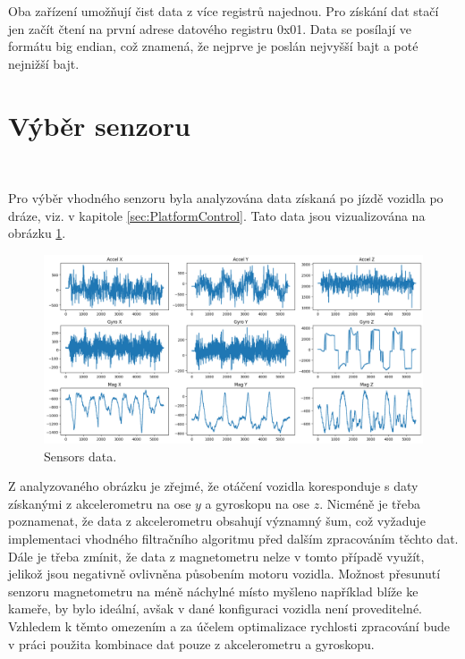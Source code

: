 Oba zařízení umožňují čist data z více registrů najednou. Pro získání dat stačí jen
začít čtení na první adrese datového registru 0x01. Data se posílají ve formátu big endian, což znamená, že nejprve je poslán nejvyšší bajt a poté nejnižší bajt.

\section{Výběr senzoru}\

Pro výběr vhodného senzoru byla analyzována data získaná po jízdě vozidla po dráze, viz. v kapitole \ref{sec:PlatformControl}. Tato data jsou vizualizována na obrázku \ref{fig:Sensors}.
\begin{figure}[!h]
    \centering
    \includegraphics[width = 0.5\linewidth]{Figures/Sensors.png}
    \caption{Sensors data.}
    \label{fig:Sensors}
\end{figure}

Z analyzovaného obrázku je zřejmé, že otáčení vozidla koresponduje s daty získanými z akcelerometru na 
ose $y$ a gyroskopu na ose $z$. Nicméně je třeba poznamenat, že data z akcelerometru obsahují významný 
šum, což vyžaduje implementaci vhodného filtračního algoritmu před dalším zpracováním těchto dat. Dále 
je třeba zmínit, že data z magnetometru nelze v tomto případě využít, jelikož jsou negativně ovlivněna 
působením motoru vozidla. Možnost přesunutí senzoru magnetometru na méně náchylné místo myšleno například 
blíže ke kameře, by bylo ideální, avšak v dané konfiguraci vozidla není proveditelné. Vzhledem k 
těmto omezením a za účelem optimalizace rychlosti zpracování bude v práci použita kombinace dat pouze z 
akcelerometru a gyroskopu.

\endinput
